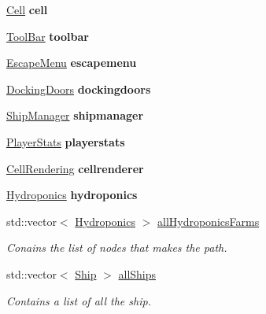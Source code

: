 \begin{DoxyCompactItemize}
\hyperlink{class_cell}{Cell} {\bfseries cell}
\item 
\mbox{\label{class_space_game_afb53554bed850fa764f75a50cc8cb2d4}} 
\hyperlink{class_tool_bar}{Tool\+Bar} {\bfseries toolbar}
\item 
\mbox{\label{class_space_game_ab64693c91c01491cb2de38ae66ca73a2}} 
\hyperlink{class_escape_menu}{Escape\+Menu} {\bfseries escapemenu}
\item 
\mbox{\label{class_space_game_a6e1f6ecc91ec7f3e4d66af8dcf6d5b5d}} 
\hyperlink{class_docking_doors}{Docking\+Doors} {\bfseries dockingdoors}
\item 
\mbox{\label{class_space_game_ad778e0b9cab95f330549ae520ee7d789}} 
\hyperlink{class_ship_manager}{Ship\+Manager} {\bfseries shipmanager}
\item 
\mbox{\label{class_space_game_a4e057dd0dc2a70ed37a438ff10a8a294}} 
\hyperlink{class_player_stats}{Player\+Stats} {\bfseries playerstats}
\item 
\mbox{\label{class_space_game_a39c6c796116b3865a11ff6174c0a6650}} 
\hyperlink{class_cell_rendering}{Cell\+Rendering} {\bfseries cellrenderer}
\item 
\mbox{\label{class_space_game_a06039d5815d6a3110dc7eb38a542d25e}} 
\hyperlink{class_hydroponics}{Hydroponics} {\bfseries hydroponics}
\item 
std\+::vector$<$ \hyperlink{class_hydroponics}{Hydroponics} $>$ \hyperlink{class_space_game_a59e762b653e6952d65f8dd51b055bc2f}{all\+Hydroponics\+Farms}
\begin{DoxyCompactList}\small\item\em Conains the list of nodes that makes the path. \end{DoxyCompactList}\item 
\mbox{\label{class_space_game_a3ec694d86ca1d451bb3ab246785c5988}} 
std\+::vector$<$ \hyperlink{class_ship}{Ship} $>$ \hyperlink{class_space_game_a3ec694d86ca1d451bb3ab246785c5988}{all\+Ships}
\begin{DoxyCompactList}\small\item\em Contains a list of all the ship. \end{DoxyCompactList}\item 

\end{DoxyCompactItemize}
